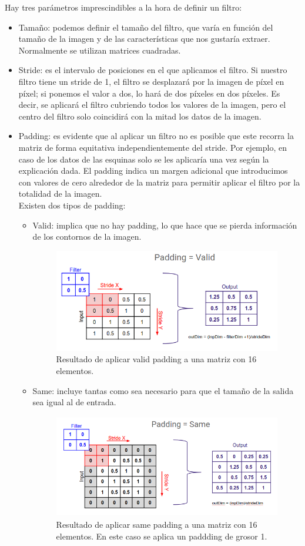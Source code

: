 \documentclass[a4paper,11pt]{article}
\begin{document}
\noindent
Hay tres parámetros imprescindibles a la hora de definir un filtro:
\begin{itemize}
\item Tamaño: podemos definir el tamaño del filtro, que varía en función del tamaño de la imagen y de las características que nos gustaría extraer.  Normalmente se utilizan matrices cuadradas.
\item Stride:  es el intervalo de posiciones en el que aplicamos el filtro. Si nuestro filtro tiene un stride de 1, el filtro se desplazará por la imagen de píxel en píxel;  si ponemos el valor a dos, lo hará de dos píxeles en dos píxeles. Es decir, se aplicará el filtro cubriendo todos los valores de la imagen, pero el centro del filtro solo coincidirá con la mitad los datos de la imagen. 
\item Padding: es evidente que al aplicar un filtro no es posible que este recorra la matriz de forma equitativa independientemente del stride. Por ejemplo, en caso de los datos de las esquinas solo se les aplicaría una vez según la explicación dada. El padding indica un margen adicional que introducimos con valores de cero alrededor de la matriz para permitir aplicar el filtro por la totalidad de la imagen. \\

\noindent
Existen dos tipos de padding:
	\begin{itemize}
	\item Valid: implica que no hay padding, lo que hace que se pierda información de los contornos de la imagen.\begin{figure}[H]
\centering
\includegraphics[width=10.0cm, height=4.5cm]{Annotation 2020-04-13 214927.png}
\caption{Resultado de aplicar valid padding a una matriz con 16 elementos.}
\end{figure}
	\item Same: incluye tantas como sea necesario para que el tamaño de la salida sea igual al de entrada.\begin{figure}[H]
\centering
\includegraphics[width=11.0cm, height=4.5cm]{Annotation 2020-04-13 215118.png}
\caption{Resultado de aplicar same padding a una matriz con 16 elementos. En este caso se aplica un paddding de grosor 1.}
\end{figure}
	\end{itemize}
\end{itemize}
\end{document}
